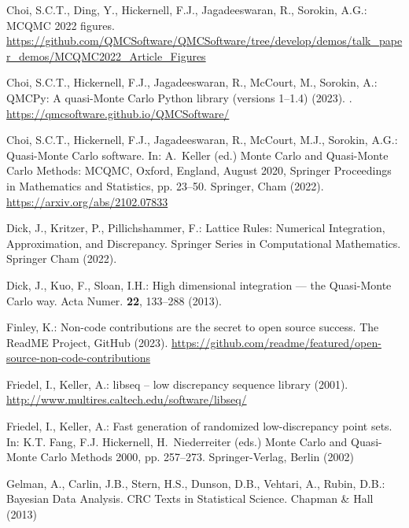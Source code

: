 \documentclass[graybox]{svmult}
\begin{document}
\begin{thebibliography}{10}
	Choi, S.C.T., Ding, Y., Hickernell, F.J., Jagadeeswaran, R., Sorokin, A.G.:
	{MCQMC} 2022 figures.
	\newblock
	\urlprefix\url{https://github.com/QMCSoftware/QMCSoftware/tree/develop/demos/talk_paper_demos/MCQMC2022_Article_Figures}

	Choi, S.C.T., Hickernell, F.J., Jagadeeswaran, R., McCourt, M., Sorokin, A.:
	{QMCPy}: A quasi-{M}onte {C}arlo {P}ython library (versions 1--1.4) (2023).
	\newblock {}.
	\newblock \urlprefix\url{https://qmcsoftware.github.io/QMCSoftware/}

	Choi, S.C.T., Hickernell, F.J., Jagadeeswaran, R., McCourt, M.J., Sorokin,
	A.G.: Quasi-{M}onte {C}arlo software.
	\newblock In: A.~Keller (ed.) {M}onte {C}arlo and Quasi-{M}onte {C}arlo
	Methods: {MCQMC}, {O}xford, England, {A}ugust 2020, Springer Proceedings in
	Mathematics and Statistics, pp. 23--50. Springer, Cham (2022).
	\newblock \url{https://arxiv.org/abs/2102.07833}

	Dick, J., Kritzer, P., Pillichshammer, F.: Lattice Rules: {N}umerical
	Integration, Approximation, and Discrepancy.
	\newblock Springer Series in Computational Mathematics. Springer Cham (2022).
	\newblock {}

	Dick, J., Kuo, F., Sloan, I.H.: High dimensional integration --- the
	{Q}uasi-{M}onte {C}arlo way.
	\newblock Acta Numer. \textbf{22}, 133--288 (2013).
	\newblock {}

	Finley, K.: Non-code contributions are the secret to open source success.
	\newblock The ReadME Project, GitHub (2023).
	\newblock
	\urlprefix\url{https://github.com/readme/featured/open-source-non-code-contributions}

	Friedel, I., Keller, A.: libseq -- low discrepancy sequence library (2001).
	\newblock \urlprefix\url{http://www.multires.caltech.edu/software/libseq/}

	Friedel, I., Keller, A.: Fast generation of randomized low-discrepancy point
	sets.
	\newblock In: K.T. Fang, F.J. Hickernell, H.~Niederreiter (eds.) {M}onte
	{C}arlo and Quasi-{M}onte {C}arlo Methods 2000, pp. 257--273.
	Springer-Verlag, Berlin (2002)

	Gelman, A., Carlin, J.B., Stern, H.S., Dunson, D.B., Vehtari, A., Rubin, D.B.:
	Bayesian Data Analysis.
	\newblock CRC Texts in Statistical Science. Chapman \& Hall (2013)


\end{thebibliography}
\end{document}
